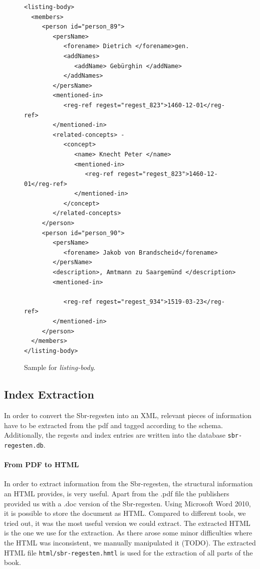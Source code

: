 \begin{figure}[H]
\begin{verbatim}
<listing-body>
  <members>
     <person id="person_89">
        <persName>
           <forename> Dietrich </forename>gen.
           <addNames>
              <addName> Gebürghin </addName>
           </addNames>
        </persName>
        <mentioned-in>
           <reg-ref regest="regest_823">1460-12-01</reg-ref>
        </mentioned-in>
        <related-concepts> -
           <concept>
              <name> Knecht Peter </name>
              <mentioned-in>
                 <reg-ref regest="regest_823">1460-12-01</reg-ref>
              </mentioned-in>
           </concept>
        </related-concepts>
     </person>
     <person id="person_90">
        <persName>
           <forename> Jakob von Brandscheid</forename>
        </persName>
        <description>, Amtmann zu Saargemünd </description>
        <mentioned-in>

           <reg-ref regest="regest_934">1519-03-23</reg-ref>
        </mentioned-in>
     </person>
  </members>
</listing-body>
\end{verbatim}
\label{fig:listing-body-xml}
\caption{Sample for \textit{listing-body}.}
\end{figure}


\subsection{Index Extraction}
In order to convert the Sbr-regesten into an XML, relevant pieces of information have to be extracted from the pdf and tagged according to the schema. Additionally, the regests and index entries are written into the database \texttt{sbr-regesten.db}.

\paragraph{From PDF to HTML}
In order to extract information from the Sbr-regesten, the structural information an HTML provides, is very useful. Apart from the .pdf file the publishers provided us with a .doc version of the Sbr-regesten. Using Microsoft Word 2010, it is possible to store the document as HTML. Compared to different tools, we tried out, it was the most useful version we could extract. The extracted HTML is the one we use for the extraction.
As there arose some minor difficulties where the HTML was inconsistent, we manually manipulated it (TODO).
The extracted HTML file \texttt{html/sbr-regesten.hmtl} is used for the extraction of all parts of the book.

